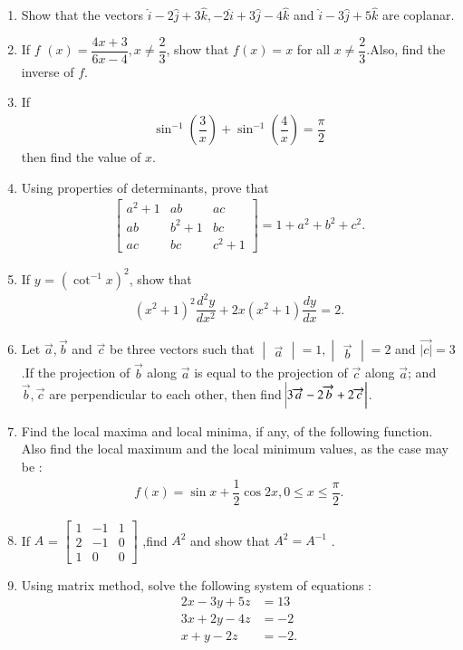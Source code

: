 \documentclass[12pt,-letter paper]{article}
\providecommand{\mydet}[1]{\ensuremath{\begin{vmatrix}#1\end{vmatrix}}}
\providecommand{\myvec}[1]{\ensuremath{\begin{bmatrix}#1\end{bmatrix}}}
\providecommand{\brak}[1]{\ensuremath{\left(#1\right)}}
\begin{document}
\begin{enumerate}
\item Show that the vectors $\hat{i} -2 \hat{j}+ 3 \hat{k},-2 \hat{i}+ 3  \hat{j} -4 \hat{k}$ and $\hat{i} -3 \hat{j}+ 5 \hat{k}$ are coplanar.

\item If $f$ $\brak{x}=\dfrac{4x+3}{6x-4},x \neq  \dfrac{2}{3} $, show that $f \brak{x}= x$ for all $x\neq \dfrac{2}{3}$.Also, find the inverse of $f$.

\item  If
\begin{align*}
 \sin^{-1} \brak{\dfrac{3}{x}} + \sin^{-1}\brak{\dfrac{4}{x}}=\dfrac{\pi}{2} 
\end{align*}
then find the value of $x$.

\item Using properties of determinants, prove that
\begin{align*}
\myvec{a^{2}+1&ab&ac\\ab&b^{2}+1&bc\\ac&bc&c^{2}+1} = 1+a^{2}+b^{2}+c^{2}.
\end{align*}

\item If $y$ = $\brak{\cot^{-1} x}^{2}$, show that
\begin{align*}
\brak{x^2+1}^2 \dfrac{d^2y}{dx^2}+2x\brak{x^{2}+1}\dfrac{dy}{dx}=2.
\end{align*} 

\item Let  $ \overrightarrow a ,\overrightarrow b$ and $\overrightarrow c $ be three vectors such that $\mydet{\overrightarrow{a}}  = 1 ,\mydet{\overrightarrow{b}}= 2$ and $\overrightarrow{|c|} =3$ .If the projection of $\overrightarrow b $ along $\overrightarrow a $ is equal to the projection of $\overrightarrow c $ along $ \overrightarrow a $; and $\overrightarrow b,\overrightarrow c $ are perpendicular to each other, then find $\abs{3\overrightarrow a-2\overrightarrow b +2\overrightarrow c}$.

\item Find the local maxima and local minima, if any, of the following function. Also find the local maximum and the local minimum values, as the case may be :
\begin{align*}
    f\brak{x}=\sin x + \dfrac{1}{2} \cos 2x,0\leq x \leq \dfrac{\pi}{2}.
\end{align*}

\item If $A$ = \myvec{1&-1&1\\2&-1&0\\1&0&0} ,find $A^{2}$ and show that $A^{2} = A^{-1}$ .
\item Using matrix method, solve the following system of equations :
\begin{align*}
    2x-3y+5z&=13\\
    3x+2y-4z &=-2\\
    x+y-2z&=-2.
\end{align*}


\end{enumerate}
\end{document}
